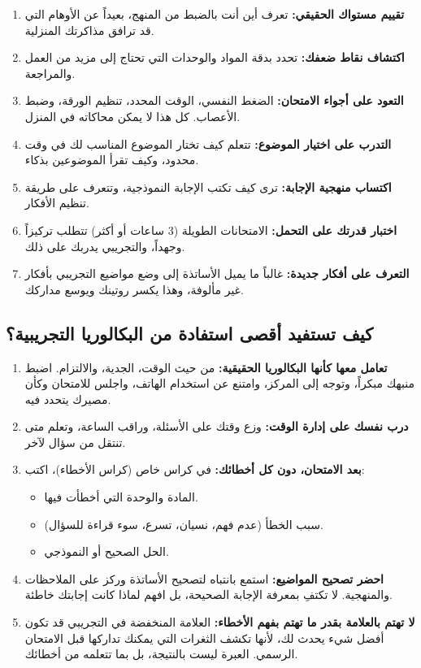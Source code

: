 \documentclass[12pt,a4paper]{book}
\begin{document}
	\begin{enumerate}
		\item \textbf{تقييم مستواك الحقيقي:} تعرف أين أنت بالضبط من المنهج، بعيداً عن الأوهام التي قد ترافق مذاكرتك المنزلية.
		\item \textbf{اكتشاف نقاط ضعفك:} تحدد بدقة المواد والوحدات التي تحتاج إلى مزيد من العمل والمراجعة.
		\item \textbf{التعود على أجواء الامتحان:} الضغط النفسي، الوقت المحدد، تنظيم الورقة، وضبط الأعصاب. كل هذا لا يمكن محاكاته في المنزل.
		\item \textbf{التدرب على اختيار الموضوع:} تتعلم كيف تختار الموضوع المناسب لك في وقت محدود، وكيف تقرأ الموضوعين بذكاء.
		\item \textbf{اكتساب منهجية الإجابة:} ترى كيف تكتب الإجابة النموذجية، وتتعرف على طريقة تنظيم الأفكار.
		\item \textbf{اختبار قدرتك على التحمل:} الامتحانات الطويلة (3 ساعات أو أكثر) تتطلب تركيزاً وجهداً، والتجريبي يدربك على ذلك.
		\item \textbf{التعرف على أفكار جديدة:} غالباً ما يميل الأساتذة إلى وضع مواضيع التجريبي بأفكار غير مألوفة، وهذا يكسر روتينك ويوسع مداركك. 
	\end{enumerate}
	
	\subsection{كيف تستفيد أقصى استفادة من البكالوريا التجريبية؟}
	
	\begin{enumerate}
		\item \textbf{تعامل معها كأنها البكالوريا الحقيقية:} من حيث الوقت، الجدية، والالتزام. اضبط منبهك مبكراً، وتوجه إلى المركز، وامتنع عن استخدام الهاتف، واجلس للامتحان وكأن مصيرك يتحدد فيه.
		\item \textbf{درب نفسك على إدارة الوقت:} وزع وقتك على الأسئلة، وراقب الساعة، وتعلم متى تنتقل من سؤال لآخر.
		\item \textbf{بعد الامتحان، دون كل أخطائك:} في كراس خاص (كراس الأخطاء)، اكتب:
		\begin{itemize}
			\item المادة والوحدة التي أخطأت فيها.
			\item سبب الخطأ (عدم فهم، نسيان، تسرع، سوء قراءة للسؤال).
			\item الحل الصحيح أو النموذجي.
		\end{itemize}
		\item \textbf{احضر تصحيح المواضيع:} استمع بانتباه لتصحيح الأساتذة وركز على الملاحظات والمنهجية. لا تكتفِ بمعرفة الإجابة الصحيحة، بل افهم لماذا كانت إجابتك خاطئة.
		\item \textbf{لا تهتم بالعلامة بقدر ما تهتم بفهم الأخطاء:} العلامة المنخفضة في التجريبي قد تكون أفضل شيء يحدث لك، لأنها تكشف الثغرات التي يمكنك تداركها قبل الامتحان الرسمي. العبرة ليست بالنتيجة، بل بما تتعلمه من أخطائك.
	\end{enumerate}
	
\end{document}

